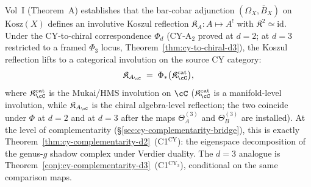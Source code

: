 \begin{remark}
\label{rem:modular-koszul-bridge-koszul-reflection}
Vol~I \cite{VolI} \textup{(}Theorem~A\textup{)} establishes that the bar-cobar adjunction $(\Omega_X, \bar B_X)$ on $\mathrm{Kosz}(X)$ defines an involutive Koszul reflection $\mathfrak{K}_A \colon A \mapsto A^!$ with $\mathfrak{K}^2 \simeq \mathrm{id}$. Under the CY-to-chiral correspondence $\Phi_d$ \textup{(}CY-A$_2$ proved at $d = 2$; at $d = 3$ restricted to a framed $\Phi_3$ locus, Theorem~\ref{thm:cy-to-chiral-d3}\textup{)}, the Koszul reflection lifts to a categorical involution on the source CY category:
\[
 \mathfrak{K}_{A_\cC} \;=\; \Phi_*\bigl(\mathfrak{K}_\cC^{\mathrm{cat}}\bigr),
\]
where $\mathfrak{K}_\cC^{\mathrm{cat}}$ is the Mukai/HMS involution on $\cC$ \textup{(}$\mathfrak{K}_\cC^{\mathrm{cat}}$ is a manifold-level involution, while $\mathfrak{K}_{A_\cC}$ is the chiral algebra-level reflection; the two coincide under $\Phi$ at $d = 2$ and at $d = 3$ after the maps $\Theta_A^{(3)}$ and $\Theta_B^{(3)}$ are installed\textup{).} At the level of complementarity \textup{(}\S\ref{sec:cy-complementarity-bridge}\textup{),} this is exactly Theorem~\ref{thm:cy-complementarity-d2}~(C1$^{\mathrm{CY}}$): the eigenspace decomposition of the genus-$g$ shadow complex under Verdier duality. The $d = 3$ analogue is Theorem~\ref{conj:cy-complementarity-d3}~(C1$^{\mathrm{CY}_3}$), conditional on the same comparison maps.
\end{remark}


